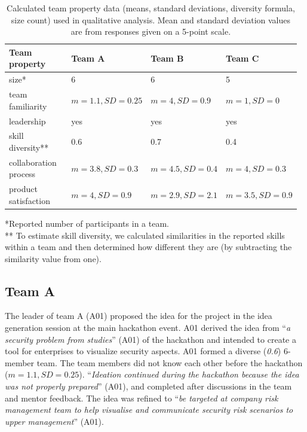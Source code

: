 \documentclass[runningheads]{llncs}
\begin{document}
\begin{table}[h]
    \caption{Calculated team property data (means, standard deviations, diversity formula, size count) used in qualitative analysis. Mean and standard deviation values are from responses given on a 5-point scale.}
    \label{tab:teamprop}
    \begin{tabular}{|p{0.25\linewidth}|p{0.24\linewidth}|p{0.24\linewidth}|p{0.24\linewidth}|}\hline
	Team property  &  Team A & Team B & Team C \\ \hline
	 size* & 6 & 6 & 5  \\\hline
	team familiarity & $m=1.1, SD=0.25$& $m=4, SD=0.9 $& $m=1, SD=0$  \\ \hline
	leadership& yes & yes & yes  \\ \hline
	skill diversity** & 0.6 & 0.7 & 0.4  \\ \hline
	collaboration process & $m=3.8, SD=0.3$ & $m=4.5, SD=0.4$ & $m=4, SD=0.3$ \\\hline
	product satisfaction & $m=4, SD=0.9$ & $m=2.9, SD=2.1$ & $m=3.5, SD=0.9 $ \\ \hline
    \end{tabular}
    *Reported number of participants in a team. \\
    ** To estimate skill diversity, we calculated similarities in the reported skills within a team and then determined how different they are (by subtracting the similarity value from one).
     \vspace{-10pt}
\end{table}

\subsection{Team A}
The leader of team A (A01) proposed the idea for the project in the idea generation session at the main hackathon event. A01 derived the idea from ``\textit{a security problem from studies}'' (A01) of the hackathon and intended to create a tool for enterprises to visualize security aspects. A01 formed a diverse (\textit{0.6}) 6-member team. The team members did not know each other before the hackathon ($m=1.1, SD=0.25$).
``\textit{Ideation continued during the hackathon because the idea was not properly prepared}'' (A01), and completed after discussions in the team and mentor feedback. The idea was refined to ``\textit{be targeted at company risk management team to help visualise and communicate security risk scenarios to upper management}'' (A01).
\end{document}
